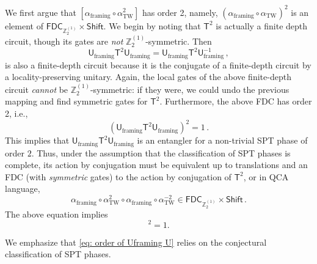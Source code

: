 \documentclass[aps,twocolumn,prx,floatfix,preprintnumbers, nofootinbib,10pt]{revtex4-2}
\numberwithin{equation}{section}
\theoremstyle{definition}
\theoremstyle{remark}
\theoremstyle{claim}
\newcommand{\aTW}{\alpha_\text{TW}}
\newcommand{\Z}{{\mathbb Z}}
\renewcommand{\sf}[1]{\mathsf{#1}}
\begin{document}
We first argue that $[\alpha_{\text{framing}} \circ \aTW^2]$ has order 2, namely, $(\alpha_{\text{framing}} \circ \aTW)^2$ is an element of $\mathsf{FDC}_{\mathbb{Z}_2^{(1)}} \times \mathsf{Shift}$. We begin by noting that $\sf{T}^2$ is actually a finite depth circuit, though its gates are \emph{not} $\Z_2^{(1)}$-symmetric.
Then
\begin{equation}
\sf{U}_{\text{framing}} \sf{T}^2 \sf{U}_{\text{framing}} = \sf{U}_{\text{framing}} \sf{T}^2 \sf{U}_{\text{framing}}^{-1} \,,
\end{equation}
is also a finite-depth circuit because it is the conjugate of a finite-depth circuit by a locality-preserving unitary. Again, the local gates of the above finite-depth circuit \emph{cannot} be $\mathbb{Z}_2^{(1)}$-symmetric: if they were, we could undo the previous mapping and find symmetric gates for $\sf{T}^2$.
Furthermore, the above FDC has order 2, i.e.,
\begin{equation}
(\sf{U}_{\text{framing}} \sf{T}^2 \sf{U}_{\text{framing}})^2 = 1 \,.
\end{equation}
This implies that $\sf{U}_{\text{framing}} \sf{T}^2 \sf{U}_{\text{framing}}$ is an entangler for a non-trivial SPT phase of order $2$.
Thus, under the assumption that the classification of SPT phases is complete, its action by conjugation must be equivalent up to translations and an FDC (with \emph{symmetric} gates) to the action by conjugation of $\sf{T}^2$, or in QCA language,
\begin{equation}
\alpha_\text{framing} \circ \aTW^2 \circ \alpha_\text{framing} \circ \aTW^{-2} \in \mathsf{FDC}_{\mathbb{Z}_2^{(1)}} \times \mathsf{Shift} \,.
\label{eq: order of Uframing U}
\end{equation}
The above equation implies
\begin{equation}
[\alpha_{\text{framing}} \circ \aTW^2]^2 = 1.
\end{equation}

We emphasize that \eqref{eq: order of Uframing U} relies on the conjectural classification of SPT phases.
\end{document}
